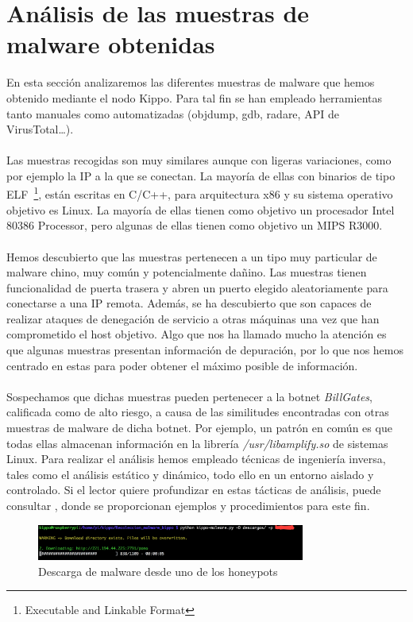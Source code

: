 \documentclass[journal]{IEEEtran}
\begin{document}
\section{Análisis de las muestras de malware obtenidas}
En esta sección analizaremos las diferentes muestras de malware que hemos obtenido mediante el nodo Kippo. Para tal fin se han empleado herramientas tanto manuales como automatizadas (objdump, gdb, radare, API de VirusTotal…).
\\\\
Las muestras recogidas son muy similares aunque con ligeras variaciones, como por ejemplo la IP a la que se conectan. La mayoría de ellas con binarios de tipo ELF~\footnote{Executable and Linkable Format}, están escritas en C/C++, para arquitectura x86 y su sistema operativo objetivo es Linux. La mayoría de ellas tienen como objetivo un procesador Intel 80386 Processor, pero algunas de ellas tienen como objetivo un MIPS R3000.
\\\\
Hemos descubierto que las muestras pertenecen a un tipo muy particular de malware chino, muy común y potencialmente dañino. Las muestras tienen funcionalidad de puerta trasera  y abren un puerto elegido aleatoriamente para conectarse a una IP remota. Además, se ha descubierto que son capaces de realizar ataques de denegación de servicio a otras máquinas una vez que han comprometido el host objetivo. Algo que nos ha llamado mucho la atención es que algunas muestras presentan información de depuración, por lo que nos hemos centrado en estas para poder obtener el máximo posible de información.
\\\\
Sospechamos que dichas muestras pueden pertenecer a la botnet \textit{BillGates}, calificada como de alto riesgo, a causa de las similitudes encontradas con otras muestras de malware de dicha botnet. Por ejemplo, un patrón en común es que todas ellas almacenan información en la librería \textit{/usr/libamplify.so} de sistemas Linux. Para realizar el análisis hemos empleado técnicas de ingeniería inversa, tales como el análisis estático y dinámico, todo ello en un entorno aislado y controlado. Si el lector quiere profundizar en estas tácticas de análisis, puede consultar \cite{know_your_enemy}, donde se proporcionan ejemplos y procedimientos para este fin.
\begin{figure}[H]
\centerline{
\includegraphics[width=8.8cm]{img/download_malware}
}
\caption{Descarga de malware desde uno de los honeypots}
\label{fig:download_malware}
\end{figure}
\end{document}
